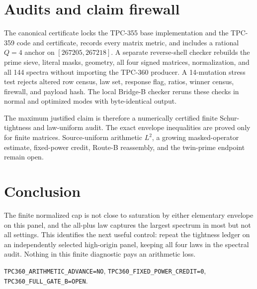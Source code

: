 \documentclass[10pt]{article}
\begin{document}
\section{Audits and claim firewall}

The canonical certificate locks the TPC-355 base implementation and the
TPC-359 code and certificate, records every matrix metric, and includes a
rational $Q=4$ anchor on $[267205,267218]$.  A separate reverse-shell checker
rebuilds the prime sieve, literal masks, geometry, all four signed matrices,
normalization, and all 144 spectra without importing the TPC-360 producer.  A
14-mutation stress test rejects altered row census, law set, response flag,
ratios, winner census, firewall, and payload hash.  The local Bridge-B checker
reruns these checks in normal and optimized modes with byte-identical output.

The maximum justified claim is therefore a numerically certified finite
Schur-tightness and law-uniform audit.  The exact envelope inequalities are
proved only for finite matrices.  Source-uniform arithmetic $L^2$, a growing
masked-operator estimate, fixed-power credit, Route-B reassembly, and the
twin-prime endpoint remain open.

\section{Conclusion}

The finite normalized cap is not close to saturation by either elementary
envelope on this panel, and the all-plus law captures the largest spectrum in
most but not all settings.  This identifies the next useful control: repeat
the tightness ledger on an independently selected high-origin panel, keeping
all four laws in the spectral audit.  Nothing in this finite diagnostic pays
an arithmetic loss.

\begin{center}\small
\texttt{TPC360\_ARITHMETIC\_ADVANCE=NO},\quad
\texttt{TPC360\_FIXED\_POWER\_CREDIT=0},\quad
\texttt{TPC360\_FULL\_GATE\_B=OPEN}.
\end{center}
\end{document}
